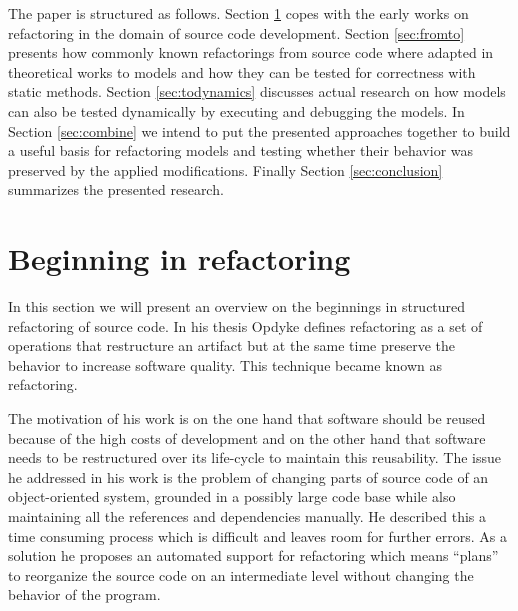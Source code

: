\documentclass{llncs}
\begin{document}
The paper is structured as follows. Section \ref{sec:beginning} copes with the early works on refactoring in the domain
of source code development. Section \ref{sec:fromto} presents how commonly known refactorings from source code where
adapted in theoretical works to models and how they can be tested for correctness with static methods. Section 
\ref{sec:todynamics} discusses actual research on how models can also be tested dynamically by executing and debugging 
the models. In Section \ref{sec:combine} we intend to put the presented approaches together to build a useful basis for 
refactoring models and testing whether their behavior was preserved by the applied modifications. Finally Section 
\ref{sec:conclusion} summarizes the presented research.

\section{Beginning in refactoring}
\label{sec:beginning}

In this section we will present an overview on the beginnings in structured refactoring of source code. In his thesis
Opdyke \cite{mast:REFOOF} defines refactoring as a set of operations that restructure an artifact but at the same time
preserve the behavior to increase software quality. This technique became known as refactoring.

The motivation of his work is on the one hand that software should be reused because of the high costs of development
and on the other hand that software needs to be restructured over its life-cycle to maintain this reusability. The issue
he addressed in his work is the problem of changing parts of source code of an object-oriented system, grounded in a
possibly large code base while also maintaining all the references and dependencies manually. He described this a time
consuming process which is difficult and leaves room for further errors. As a solution he proposes an automated support
for refactoring which means ``plans'' to reorganize the source code on an intermediate level without changing the behavior
of the program.
\end{document}
